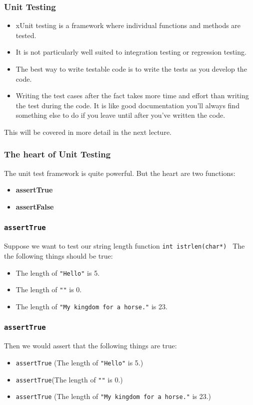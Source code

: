\documentclass{beamer}
\begin{document}
\begin{frame}
  \frametitle{Unit Testing}
  \begin{itemize}
  \item xUnit testing is a framework where individual functions and
    methods are tested. 
  \item It is not particularly well suited to integration testing or
    regression testing.
  \item The best way to write testable code is to write the tests as
    you develop the code. 
  \item Writing the test cases after the fact takes more time and
    effort than writing the test during the code. It is like good
    documentation you'll always find something else to do if you leave
    until after you've written the code.  
  \end{itemize}
  This will be covered in more detail in the next lecture.
\end{frame}
\begin{frame}
  \frametitle{The heart of Unit Testing}

  The unit test framework is quite powerful. But the heart are two
  functions:
  \begin{itemize}
  \item {\bf assertTrue} 
  \item {\bf assertFalse}
  \end{itemize}
\end{frame}

\begin{frame}
  \frametitle{{\tt assertTrue}}
 Suppose we want to test our string length function {\tt int
   istrlen(char*) }
The the following things should be true:
\begin{itemize}
\item The length of {\tt "Hello"} is 5.
\item The length of {\tt ""} is 0.
\item The length of {\tt "My kingdom for a horse."} is 23.
\end{itemize}
\end{frame}
\begin{frame}
  \frametitle{{\tt assertTrue}}
Then we would assert that the following things are true:
\begin{itemize}
\item {\tt assertTrue} (The length of {\tt "Hello"} is 5.)
\item  {\tt assertTrue}(The length of {\tt ""} is 0.)
\item  {\tt assertTrue} (The length of {\tt "My kingdom for a horse."}
  is 23.)
\end{itemize}
\end{frame}
\end{document}
